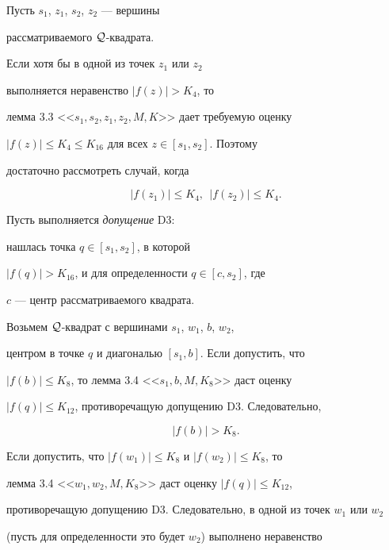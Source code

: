 \begin{pf}


Пусть $s_1$, $z_1$, $s_2$, $z_2$ --- вершины 


рассматриваемого ${\cal Q}$-квадрата. 


Если хотя бы в одной из точек $z_1$ или $z_2$ 


выполняется неравенство $|f(z)| > K_4$, то 


лемма 3.3 <<$s_1, s_2, z_1, z_2, M, K$>> дает требуемую оценку 


$|f(z)| \leq K_4 \leq K_{16}$ для всех $z\in [s_1, s_2]$. Поэтому 


достаточно рассмотреть случай, когда


\begin{equation}


\label{3.5.3}


|f(z_1)| \leq K_4, \ \ |f(z_2)| \leq K_4.


\end{equation}


Пусть выполняется {\it допущение} D3:


нашлась точка $q\in [s_1, s_2]$, в которой 


$|f(q)| > K_{16}$, и для определенности $q\in [c, s_2]$, где 


$c$ --- центр рассматриваемого квадрата. 


Возьмем ${\cal Q}$-квадрат с вершинами $s_1$, $w_1$, $b$, $w_2$,


центром в точке $q$ и диагональю $[s_1, b]$. Если допустить, что 


$|f(b)| \leq K_8$, то лемма 3.4 <<$s_1, b, M, K_8$>> даст оценку 


$|f(q)| \leq K_{12}$, противоречащую допущению D3. Следовательно,


\begin{equation}


\label{3.5.4}


|f(b)| > K_8.


\end{equation}


Если допустить, что $|f(w_1)| \leq K_8$ и $|f(w_2)| \leq K_8$, то 


лемма 3.4 <<$w_1, w_2, M, K_8$>> даст оценку $|f(q)| \leq K_{12}$, 


противоречащую допущению D3. Следовательно, в одной из точек $w_1$ или $w_2$ 


(пусть для определенности это будет $w_2$) выполнено неравенство 



\end{pf}
